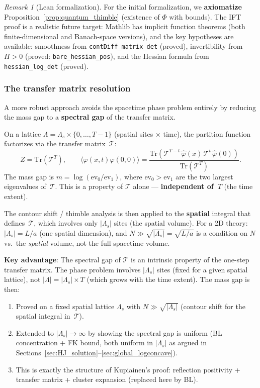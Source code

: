 \documentclass[12pt]{article}
\theoremstyle{definition}
\theoremstyle{remark}
\newtheorem{remark}[theorem]{Remark}
\newcommand{\Tr}{\mathrm{Tr}}
\newcommand{\ph}{\varphi}
\newcommand{\La}{\Lambda}
\begin{document}
\begin{remark}[Lean formalization]
For the initial formalization, we \textbf{axiomatize}
Proposition~\ref{prop:quantum_thimble} (existence of $\Phi$
with bounds). The IFT proof is a realistic future target:
Mathlib has implicit function theorems (both finite-dimensional
and Banach-space versions), and the key hypotheses are available:
smoothness from \texttt{contDiff\_matrix\_det} (proved),
invertibility from $H > 0$ (proved: \texttt{bare\_hessian\_pos}),
and the Hessian formula from \texttt{hessian\_log\_det} (proved).
\end{remark}

\subsubsection{The transfer matrix resolution}
\label{sec:transfer_matrix}

A more robust approach avoids the spacetime phase problem
entirely by reducing the mass gap to a \textbf{spectral gap}
of the transfer matrix.

On a lattice $\La = \La_s \times \{0,\ldots,T-1\}$ (spatial
sites $\times$ time), the partition function factorizes via the
transfer matrix~$\mathcal{T}$:
\begin{equation}
  Z = \Tr(\mathcal{T}^T), \qquad
  \langle\ph(x,t)\ph(0,0)\rangle
    = \frac{\Tr(\mathcal{T}^{T-t}\,\hat\ph(x)\,\mathcal{T}^t\,\hat\ph(0))}
           {\Tr(\mathcal{T}^T)}.
\end{equation}
The mass gap is $m = \log(\mathrm{ev}_0/\mathrm{ev}_1)$, where
$\mathrm{ev}_0 > \mathrm{ev}_1$ are the two largest eigenvalues
of~$\mathcal{T}$. This is a property of $\mathcal{T}$ alone ---
\textbf{independent of~$T$} (the time extent).

The contour shift / thimble analysis is then applied to the
\textbf{spatial} integral that defines~$\mathcal{T}$, which
involves only $|\La_s|$ sites (the spatial volume). For a 2D
theory: $|\La_s| = L/a$ (one spatial dimension), and
$N \gg \sqrt{|\La_s|} = \sqrt{L/a}$ is a condition on $N$
vs.\ the \emph{spatial} volume, not the full spacetime volume.

\textbf{Key advantage}: The spectral gap of $\mathcal{T}$ is an
intrinsic property of the one-step transfer matrix. The phase
problem involves $|\La_s|$ sites (fixed for a given spatial
lattice), not $|\La| = |\La_s| \times T$ (which grows with
the time extent). The mass gap is then:
\begin{enumerate}
\item Proved on a fixed spatial lattice $\La_s$ with
  $N \gg \sqrt{|\La_s|}$ (contour shift for the spatial
  integral in~$\mathcal{T}$).
\item Extended to $|\La_s| \to \infty$ by showing the spectral
  gap is uniform (BL concentration + FK bound, both uniform in
  $|\La_s|$ as argued in Sections~\ref{sec:HJ_solution}--\ref{sec:global_logconcave}).
\item This is exactly the structure of Kupiainen's proof:
  reflection positivity + transfer matrix + cluster expansion
  (replaced here by BL).
\end{enumerate}
\end{document}
